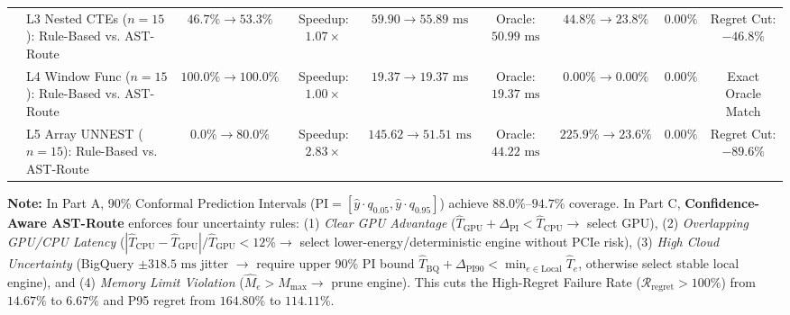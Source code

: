 \documentclass[10pt,a4paper]{article}
\begin{document}
\begin{table}[!t]
{\begin{tabular}{@{}llccccccc@{}}
 & L3 Nested CTEs ($n=15$): Rule-Based vs. AST-Route & $46.7\%\rightarrow 53.3\%$ & Speedup: $1.07\times$ & $59.90\rightarrow 55.89\text{ ms}$ & Oracle: $50.99\text{ ms}$ & $44.8\%\rightarrow 23.8\%$ & $0.00\%$ & Regret Cut: $-46.8\%$ \\
 & L4 Window Func ($n=15$): Rule-Based vs. AST-Route & $100.0\%\rightarrow 100.0\%$ & Speedup: $1.00\times$ & $19.37\rightarrow 19.37\text{ ms}$ & Oracle: $19.37\text{ ms}$ & $0.00\%\rightarrow 0.00\%$ & $0.00\%$ & Exact Oracle Match \\
 & L5 Array UNNEST ($n=15$): Rule-Based vs. AST-Route & $0.0\%\rightarrow 80.0\%$ & Speedup: $\mathbf{2.83\times}$ & $145.62\rightarrow 51.51\text{ ms}$ & Oracle: $44.22\text{ ms}$ & $225.9\%\rightarrow 23.6\%$ & $0.00\%$ & Regret Cut: $\mathbf{-89.6\%}$ \\
\bottomrule
\end{tabular}%
}
\vspace{2pt}
\parbox{\textwidth}{\scriptsize \textbf{Note:} In Part A, 90\% Conformal Prediction Intervals ($\text{PI} = [\hat{y}\cdot q_{0.05}, \hat{y}\cdot q_{0.95}]$) achieve $88.0\%\text{--}94.7\%$ coverage. In Part C, \textbf{Confidence-Aware AST-Route} enforces four uncertainty rules: (1) \emph{Clear GPU Advantage} ($\hat{T}_{\text{GPU}} + \Delta_{\text{PI}} < \hat{T}_{\text{CPU}} \rightarrow$ select GPU), (2) \emph{Overlapping GPU/CPU Latency} ($|\hat{T}_{\text{CPU}}-\hat{T}_{\text{GPU}}|/\hat{T}_{\text{GPU}} < 12\% \rightarrow$ select lower-energy/deterministic engine without PCIe risk), (3) \emph{High Cloud Uncertainty} (BigQuery $\pm 318.5\text{ ms}$ jitter $\rightarrow$ require upper 90\% PI bound $\hat{T}_{\text{BQ}} + \Delta_{\text{PI90}} < \min_{e\in\text{Local}} \hat{T}_e$, otherwise select stable local engine), and (4) \emph{Memory Limit Violation} ($\hat{M}_e > M_{\max} \rightarrow$ prune engine). This cuts the High-Regret Failure Rate ($\mathcal{R}_{\text{regret}} > 100\%$) from $14.67\%$ to $6.67\%$ and P95 regret from $164.80\%$ to $114.11\%$.}
\end{table}
\end{document}
